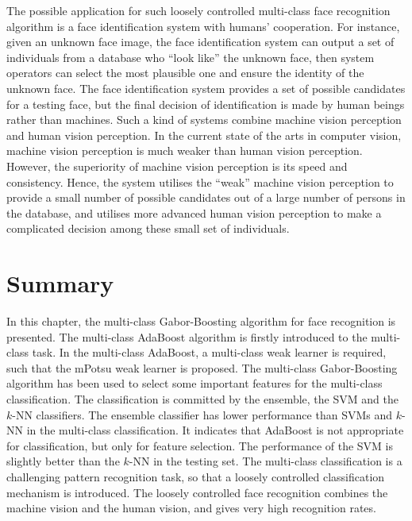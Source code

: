 The possible application for such loosely controlled multi-class face recognition algorithm is a face identification system with humans' cooperation. For instance, given an unknown face image, the face identification system can output a set of individuals from a database who ``look like'' the unknown face, then system operators can select the most plausible one and ensure the identity of the unknown face. The face identification system provides a set of possible candidates for a testing face, but the final decision of identification is made by human beings rather than machines. Such a kind of systems combine machine vision perception and human vision perception. In the current state of the arts in computer vision, machine vision perception is much weaker than human vision perception. However, the superiority of machine vision perception is its speed and consistency. Hence, the system utilises the ``weak'' machine vision perception to provide a small number of possible candidates out of a large number of persons in the database, and utilises more advanced human vision perception to make a complicated decision among these small set of individuals. 


\section{Summary}
\label{sec:multisummary}
In this chapter, the multi-class Gabor-Boosting algorithm for face recognition is presented. The multi-class AdaBoost algorithm is firstly introduced to the multi-class task. In the multi-class AdaBoost, a multi-class weak learner is required, such that the mPotsu weak learner is proposed. The multi-class Gabor-Boosting algorithm has been used to select some important features for the multi-class classification. The classification is committed by the ensemble, the SVM  and the $k$-NN classifiers. The ensemble classifier has lower performance than SVMs and $k$-NN in the multi-class classification. It indicates that AdaBoost is not appropriate for classification, but only for feature selection. The performance of the SVM is slightly better than the $k$-NN in the testing set. The multi-class classification is a challenging pattern recognition task, so that a loosely controlled classification mechanism is introduced. The loosely controlled face recognition combines the machine vision and the human vision, and gives very high recognition rates.
